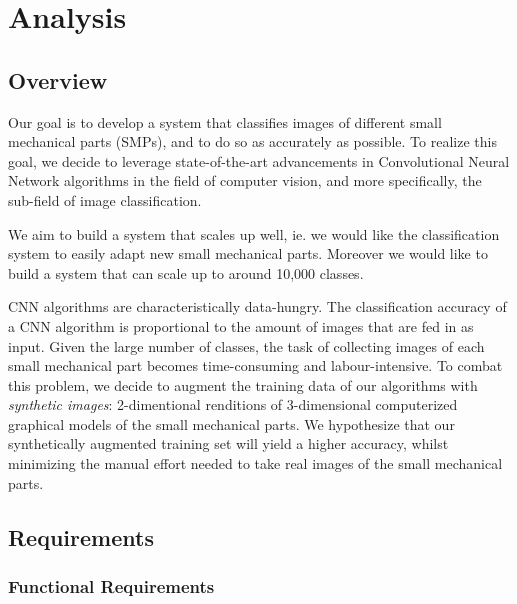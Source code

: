 \documentclass[a4paper,12pt,twoside]{report}
\begin{document}

\chapter{Analysis}


\section{Overview}

Our goal is to develop a system that classifies images of different small mechanical parts (SMPs), and to do so as accurately as possible. To realize this goal, we decide to leverage state-of-the-art advancements in Convolutional Neural Network algorithms in the field of computer vision, and more specifically, the sub-field of image classification.

We aim to build a system that scales up well, ie. we would like the classification system to easily adapt new small mechanical parts. Moreover we would like to build a system that can scale up to around 10,000 classes.

CNN algorithms are characteristically data-hungry. The classification accuracy of a CNN algorithm is proportional to the amount of images that are fed in as input. Given the large number of classes, the task of collecting images of each small mechanical part becomes time-consuming and labour-intensive. To combat this problem, we decide to augment the training data of our algorithms with \textit{synthetic images}: 2-dimentional renditions of 3-dimensional computerized graphical models of the small mechanical parts. We hypothesize that our synthetically augmented training set will yield a higher accuracy, whilst minimizing the manual effort needed to take real images of the small mechanical parts.

\section{Requirements}

\subsection{Functional Requirements}
\end{document}
